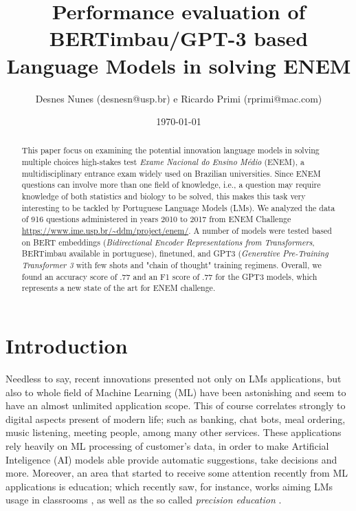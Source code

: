 \documentclass{article}
\title{Performance evaluation of BERTimbau/GPT-3 based Language Models in solving ENEM}
\author{Desnes Nunes (desnesn@usp.br) e Ricardo Primi (rprimi@mac.com)}
\date{\today}
\begin{document}
\maketitle

\begin{abstract}

This paper focus on examining the potential innovation language models in solving multiple choices high-stakes test \textit{Exame Nacional do Ensino Médio} (ENEM), a multidisciplinary entrance exam widely used on Brazilian universities. Since ENEM questions can involve more than one field of knowledge, i.e., a question may require knowledge of both statistics and biology to be solved, this makes this task very interesting to be tackled by Portuguese Language Models (LMs). We analyzed the data of 916 questions administered in years 2010 to 2017 from ENEM Challenge \url{https://www.ime.usp.br/~ddm/project/enem/}. A number of models were tested based on  BERT embeddings (\textit{Bidirectional Encoder Representations from Transformers}, BERTimbau available in portuguese), finetuned, and GPT3 (\textit{Generative Pre-Training Transformer 3} with few shots and "chain of thought" training regimens. Overall, we found an accuracy score of .77 and an F1 score of .77 for the GPT3 models, which represents a new state of the art for ENEM challenge.

\end{abstract}

\section{Introduction}

Needless to say, recent innovations presented not only on LMs applications, but also to whole field of Machine Learning (ML) have been astonishing and seem to have an  almost unlimited application scope. This of course correlates strongly to digital aspects present of modern life; such as banking, chat bots, meal ordering, music listening, meeting people, among many other services. These applications rely heavily on ML processing of customer's data, in order to make Artificial Inteligence (AI) models able provide automatic suggestions, take decisions and more. Moreover, an area that started to receive some attention recently from ML applications is education; which recently saw, for instance, works aiming LMs usage in classrooms \cite{kuvcak2018machine}, as well as the so called \textit{precision education} \cite{luan2021review}. 
\end{document}
